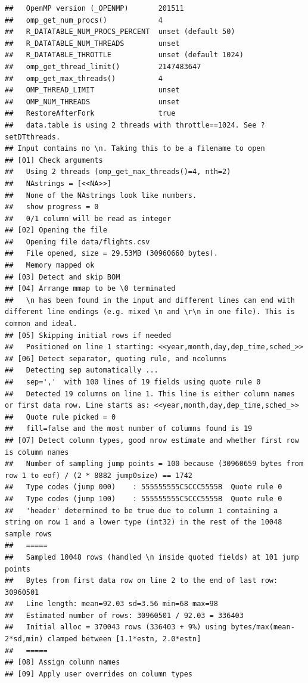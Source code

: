 \documentclass[
  12pt,
]{style/krantz}
\begin{document}
\begin{verbatim}
##   OpenMP version (_OPENMP)       201511
##   omp_get_num_procs()            4
##   R_DATATABLE_NUM_PROCS_PERCENT  unset (default 50)
##   R_DATATABLE_NUM_THREADS        unset
##   R_DATATABLE_THROTTLE           unset (default 1024)
##   omp_get_thread_limit()         2147483647
##   omp_get_max_threads()          4
##   OMP_THREAD_LIMIT               unset
##   OMP_NUM_THREADS                unset
##   RestoreAfterFork               true
##   data.table is using 2 threads with throttle==1024. See ?setDTthreads.
## Input contains no \n. Taking this to be a filename to open
## [01] Check arguments
##   Using 2 threads (omp_get_max_threads()=4, nth=2)
##   NAstrings = [<<NA>>]
##   None of the NAstrings look like numbers.
##   show progress = 0
##   0/1 column will be read as integer
## [02] Opening the file
##   Opening file data/flights.csv
##   File opened, size = 29.53MB (30960660 bytes).
##   Memory mapped ok
## [03] Detect and skip BOM
## [04] Arrange mmap to be \0 terminated
##   \n has been found in the input and different lines can end with different line endings (e.g. mixed \n and \r\n in one file). This is common and ideal.
## [05] Skipping initial rows if needed
##   Positioned on line 1 starting: <<year,month,day,dep_time,sched_>>
## [06] Detect separator, quoting rule, and ncolumns
##   Detecting sep automatically ...
##   sep=','  with 100 lines of 19 fields using quote rule 0
##   Detected 19 columns on line 1. This line is either column names or first data row. Line starts as: <<year,month,day,dep_time,sched_>>
##   Quote rule picked = 0
##   fill=false and the most number of columns found is 19
## [07] Detect column types, good nrow estimate and whether first row is column names
##   Number of sampling jump points = 100 because (30960659 bytes from row 1 to eof) / (2 * 8882 jump0size) == 1742
##   Type codes (jump 000)    : 555555555C5CCC5555B  Quote rule 0
##   Type codes (jump 100)    : 555555555C5CCC5555B  Quote rule 0
##   'header' determined to be true due to column 1 containing a string on row 1 and a lower type (int32) in the rest of the 10048 sample rows
##   =====
##   Sampled 10048 rows (handled \n inside quoted fields) at 101 jump points
##   Bytes from first data row on line 2 to the end of last row: 30960501
##   Line length: mean=92.03 sd=3.56 min=68 max=98
##   Estimated number of rows: 30960501 / 92.03 = 336403
##   Initial alloc = 370043 rows (336403 + 9%) using bytes/max(mean-2*sd,min) clamped between [1.1*estn, 2.0*estn]
##   =====
## [08] Assign column names
## [09] Apply user overrides on column types

\end{verbatim}
\end{document}
